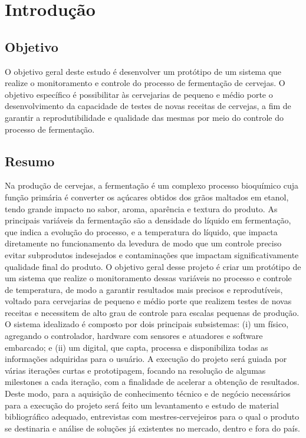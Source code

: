 \chapter{Introdução}

\section{Objetivo}

O objetivo geral deste estudo é desenvolver um protótipo de um sistema que realize o monitoramento e controle do processo de fermentação de cervejas.
O objetivo específico é possibilitar às cervejarias de pequeno e médio porte o desenvolvimento da capacidade de testes de novas receitas de cervejas, 
a fim de garantir a reprodutibilidade e qualidade das mesmas por meio do controle do processo de fermentação.

\section{Resumo}
Na produção de cervejas, a fermentação é um complexo processo bioquímico cuja função primária é converter os açúcares obtidos dos grãos maltados em etanol, tendo grande impacto no sabor, aroma, aparência e textura do produto. 
As principais variáveis da fermentação são a densidade do líquido em fermentação, que indica a evolução do processo, e a temperatura do líquido, que impacta diretamente no funcionamento da levedura de modo que um controle preciso evitar subprodutos indesejados e contaminações que impactam significativamente qualidade final do produto. 
O objetivo geral desse projeto é criar um protótipo de um sistema que realize o monitoramento dessas variáveis no processo e controle de temperatura, de modo a garantir resultados mais precisos e reprodutíveis, voltado para cervejarias de pequeno e médio porte que realizem testes de novas receitas e necessitem de alto grau de controle para escalas pequenas de produção. 
O sistema idealizado é composto por dois principais subsistemas: (i) um físico, agregando o controlador, hardware com sensores e atuadores e software embarcado; e (ii) um digital, que capta, processa e disponibiliza todas as informações adquiridas para o usuário. A execução do projeto será guiada por várias iterações curtas e prototipagem, focando na resolução de algumas milestones a cada iteração, com a finalidade de acelerar a obtenção de resultados.
Deste modo, para a aquisição de conhecimento técnico e de negócio necessários para a execução do projeto será feito um levantamento e estudo de material bibliográfico adequado, entrevistas com mestres-cervejeiros para o qual o produto se destinaria e análise de soluções já existentes no mercado, dentro e fora do país.

